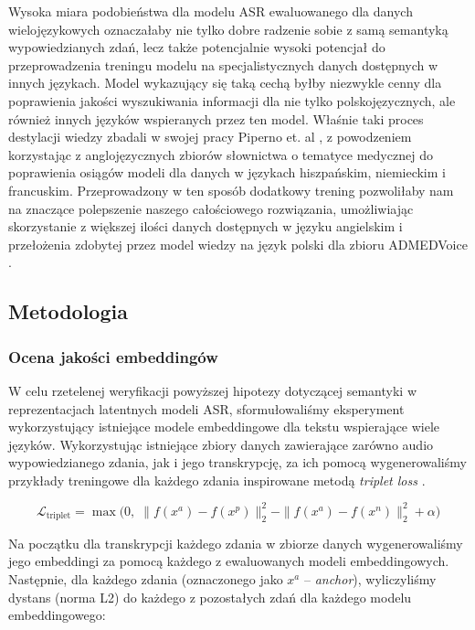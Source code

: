 Wysoka miara podobieństwa dla modelu ASR ewaluowanego dla danych wielojęzykowych oznaczałaby nie tylko dobre radzenie sobie z samą semantyką wypowiedzianych zdań, lecz także potencjalnie wysoki potencjał do przeprowadzenia treningu modelu na specjalistycznych danych dostępnych w innych językach. Model wykazujący się taką cechą byłby niezwykle cenny dla poprawienia jakości wyszukiwania informacji dla nie tylko polskojęzycznych, ale również innych języków wspieranych przez ten model. Właśnie taki proces destylacji wiedzy zbadali w swojej pracy Piperno et. al \cite{multilingualDomainTranslation}, z powodzeniem korzystając z anglojęzycznych zbiorów słownictwa o tematyce medycznej do poprawienia osiągów modeli dla danych w językach hiszpańskim, niemieckim i francuskim. Przeprowadzony w ten sposób dodatkowy trening pozwoliłaby nam na znaczące polepszenie naszego całościowego rozwiązania, umożliwiając skorzystanie z większej ilości danych dostępnych w języku angielskim i przełożenia zdobytej przez model wiedzy na język polski dla zbioru ADMEDVoice \cite{ADMEDVoice}.


\subsection{Metodologia}
\subsubsection{Ocena jakości embeddingów}
W celu rzetelenej weryfikacji powyższej hipotezy dotyczącej semantyki w reprezentacjach latentnych modeli ASR, sformułowaliśmy eksperyment wykorzystujący istniejące modele embeddingowe dla tekstu wspierające wiele języków. Wykorzystując istniejące zbiory danych zawierające zarówno audio wypowiedzianego zdania, jak i jego transkrypcję, za ich pomocą wygenerowaliśmy przykłady treningowe dla każdego zdania inspirowane metodą \textit{triplet loss} \cite{tripletLoss}.

\begin{equation}
    \mathcal{L}_{\text{triplet}} = \max \Big( 0, \; \| f(x^a) - f(x^p) \|_2^2 - \| f(x^a) - f(x^n) \|_2^2 + \alpha \Big)
    \label{eq:tripletloss}
\end{equation}

Na początku dla transkrypcji każdego zdania w zbiorze danych wygenerowaliśmy jego embeddingi za pomocą każdego z ewaluowanych modeli embeddingowych. Następnie, dla każdego zdania (oznaczonego jako $x^a$ -- \textit{anchor}), wyliczyliśmy dystans (norma L2) do każdego z pozostałych zdań dla każdego modelu embeddingowego:


